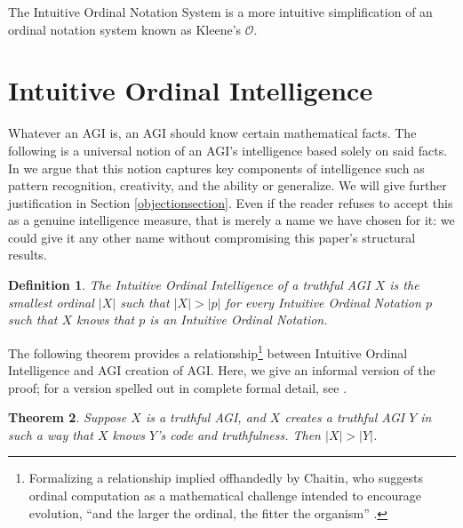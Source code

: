 \documentclass[runningheads]{llncs}
\newtheorem{mytheorem}{Theorem}
\newtheorem{mydefinition}[mytheorem]{Definition}
\begin{document}
The Intuitive Ordinal Notation System is a more intuitive simplification of
an ordinal notation system known as Kleene's $\mathcal O$.

\section{Intuitive Ordinal Intelligence}
\label{informalargumentsection}

Whatever an AGI is, an AGI should know certain
mathematical facts.
The following is a universal notion of an AGI's intelligence based
solely on said facts. In \cite{alexander2019measuring}
we argue that this notion captures key components of intelligence such as
pattern recognition, creativity, and the ability or
generalize. We will give further justification in
Section \ref{objectionsection}. Even if the reader refuses to accept this as
a genuine intelligence measure, that is merely a name we have chosen for it:
we could give it any other name without compromising this paper's structural
results.

\begin{mydefinition}
\label{maindefinition}
    The \emph{Intuitive Ordinal Intelligence} of a truthful AGI $X$ is the smallest
    ordinal $|X|$ such that $|X|>|p|$ for every Intuitive Ordinal Notation
    $p$ such that $X$ knows that $p$ is an
    Intuitive Ordinal Notation.
\end{mydefinition}

The following theorem provides a relationship\footnote{Formalizing a relationship implied
offhandedly by Chaitin, who suggests ordinal computation as a mathematical challenge
intended to encourage evolution, ``and the larger the ordinal,
the fitter the organism'' \cite{chaitin}.} between Intuitive Ordinal Intelligence
and AGI creation of AGI. Here, we give an informal version of the proof; for a version
spelled out in complete formal detail, see \cite{alexander2019measuring}.

\begin{mytheorem}
\label{maintheorem}
    Suppose $X$ is a truthful AGI, and $X$ creates a truthful AGI $Y$
    in such a way that $X$ knows $Y$'s code and truthfulness. Then
    $|X|>|Y|$.
\end{mytheorem}
\end{document}
